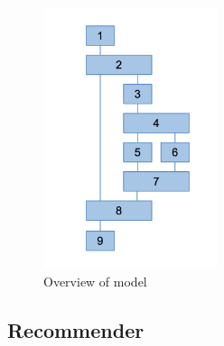 \begin{figure}[H]
	\centering
	\includegraphics[width=2in]{./section-chapter2/images/apisentencetree-ex1.png}
	\caption{Overview of model}
	\label{fig:asp-1}
\end{figure}



\subsection{Recommender}
